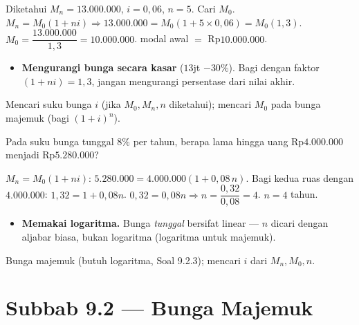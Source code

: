 \jawab
{} Diketahui $M_n=13.000.000$, $i=0{,}06$, $n=5$. Cari $M_0$.
 $M_n=M_0(1+ni)\Rightarrow 13.000.000=M_0(1+5\times0{,}06)
=M_0(1{,}3)$.
 $M_0=\dfrac{13.000.000}{1{,}3}=10.000.000$.
\jadi modal awal $=$ Rp$10.000.000$.

\begin{jebakan}
\begin{itemize}[leftmargin=*,topsep=2pt]
  \item \textbf{Mengurangi bunga secara kasar} ($13$jt $-30\%$). Bagi dengan
  faktor $(1+ni)=1{,}3$, jangan mengurangi persentase dari nilai akhir.
\end{itemize}
\end{jebakan}

\begin{variasi}
Mencari suku bunga $i$ (jika $M_0,M_n,n$ diketahui); mencari $M_0$ pada bunga
majemuk (bagi $(1+i)^n$).
\end{variasi}

\begin{soalbox}{}
Pada suku bunga tunggal $8\%$ per tahun, berapa lama hingga uang Rp$4.000.000$
menjadi Rp$5.280.000$?
\end{soalbox}

\jawab
{} $M_n=M_0(1+ni)$: $5.280.000=4.000.000(1+0{,}08\,n)$.
 Bagi kedua ruas dengan $4.000.000$: $1{,}32=1+0{,}08n$.
 $0{,}32=0{,}08n\Rightarrow n=\dfrac{0{,}32}{0{,}08}=4$.
\jadi $n=4$ tahun.

\begin{jebakan}
\begin{itemize}[leftmargin=*,topsep=2pt]
  \item \textbf{Memakai logaritma.} Bunga \emph{tunggal} bersifat linear ---
  $n$ dicari dengan aljabar biasa, bukan logaritma (logaritma untuk majemuk).
\end{itemize}
\end{jebakan}

\begin{variasi}
Bunga majemuk (butuh logaritma, Soal 9.2.3); mencari $i$ dari $M_n,M_0,n$.
\end{variasi}

\section*{Subbab 9.2 — Bunga Majemuk}


